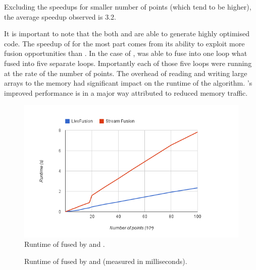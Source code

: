 \documentclass[preamble.tex]{subfiles}
\begin{document}
Excluding the speedups for smaller number of points (which tend to be higher), the average speedup observed is 3.2.


\begin{bluebox}
It is important to note that the both \LiveFusion and \StreamFusion are able to generate highly optimised code. The speedup of \LiveFusion for the most part comes from its ability to exploit more fusion opportunities than \StreamFusion. In the case of \FilterMax, \LiveFusion was able to fuse into one loop what \StreamFusion fused into five separate loops. Importantly each of those five loops were running at the rate of the number of points. The overhead of reading and writing large arrays to the memory had significant impact on the runtime of the algorithm. \LiveFusion's improved performance is in a major way attributed to reduced memory traffic.
\end{bluebox}


\begin{figure}
\includegraphics[scale=0.85,center]{img/Eval-FarAndAboves}
\caption{Runtime of \FilterMax fused by \StreamFusion and \LiveFusion.}
\label{fig:Eval-FarAndAboves}
\end{figure}

\begin{figure}
\caption{Runtime of \FilterMax fused by \StreamFusion and \LiveFusion (measured in milliseconds).}
\label{fig:Eval-FarAndAboves-numbers}
\end{figure}








\IfNotCompilingAll{}
\end{document}
